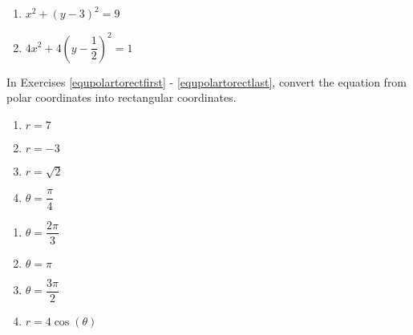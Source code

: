 \documentclass{ximera}
\begin{document}
\begin{multicols}{2} 

\begin{enumerate}

\setcounter{enumi}{\value{HW}}

\item $x^{2} + (y - 3)^{2} = 9$ 
\item $4x^2 + 4\left( y - \dfrac{1}{2} \right)^2 = 1$ \label{equrecttopolarlast}

\setcounter{HW}{\value{enumi}}

\end{enumerate}

\end{multicols}

In Exercises \ref{equpolartorectfirst} - \ref{equpolartorectlast}, convert the equation from polar coordinates into rectangular coordinates.  

\begin{multicols}{4}

\begin{enumerate}

\setcounter{enumi}{\value{HW}}

\item $r = 7$  \label{equpolartorectfirst}
\item $r = -3$ 
\item $r = \sqrt{2}$ 
\item $\theta = \dfrac{\pi}{4}$

\setcounter{HW}{\value{enumi}}

\end{enumerate}

\end{multicols}

\begin{multicols}{4} 

\begin{enumerate}

\setcounter{enumi}{\value{HW}}

\item $\theta = \dfrac{2\pi}{3}$
\item $\theta = \pi$ 
\item $\theta = \dfrac{3\pi}{2}$
\item $r = 4\cos(\theta)$ 

\setcounter{HW}{\value{enumi}}

\end{enumerate}

\end{multicols}
\end{document}
